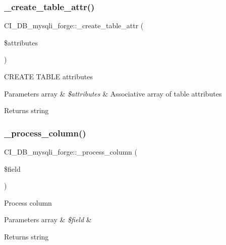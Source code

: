 \subsubsection{\texorpdfstring{\+\_\+create\+\_\+table\+\_\+attr()}{\_create\_table\_attr()}}
{\footnotesize\ttfamily C\+I\+\_\+\+D\+B\+\_\+mysqli\+\_\+forge\+::\+\_\+create\+\_\+table\+\_\+attr (\begin{DoxyParamCaption}\item[{}]{\$attributes }\end{DoxyParamCaption})\hspace{0.3cm}{\ttfamily [protected]}}

C\+R\+E\+A\+TE T\+A\+B\+LE attributes


\begin{DoxyParams}[1]{Parameters}
array & {\em \$attributes} & Associative array of table attributes \\
\hline
\end{DoxyParams}
\begin{DoxyReturn}{Returns}
string 
\end{DoxyReturn}
\mbox{\label{class_c_i___d_b__mysqli__forge_aa50b0244f2629814dbd57446f6fc77b0}} 
\subsubsection{\texorpdfstring{\+\_\+process\+\_\+column()}{\_process\_column()}}
{\footnotesize\ttfamily C\+I\+\_\+\+D\+B\+\_\+mysqli\+\_\+forge\+::\+\_\+process\+\_\+column (\begin{DoxyParamCaption}\item[{}]{\$field }\end{DoxyParamCaption})\hspace{0.3cm}{\ttfamily [protected]}}

Process column


\begin{DoxyParams}[1]{Parameters}
array & {\em \$field} & \\
\hline
\end{DoxyParams}
\begin{DoxyReturn}{Returns}
string 
\end{DoxyReturn}
\mbox{\label{class_c_i___d_b__mysqli__forge_ac228725d7373cba7cf1e69b736b310bf}} 
